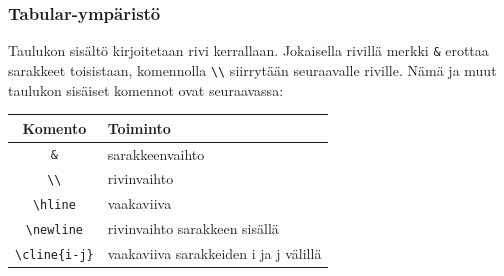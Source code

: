 \begin{frame}[fragile]
    \frametitle{Tabular-ympäristö}
    Taulukon sisältö kirjoitetaan rivi kerrallaan. Jokaisella rivillä merkki \verb-&- erottaa sarakkeet toisistaan, komennolla \verb-\\- siirrytään seuraavalle riville.  Nämä ja muut taulukon sisäiset komennot ovat seuraavassa:
    \vaihto
    \begin{table}[h!]
        \begin{scriptsize}
            \begin{tabular}{cp{4cm}}
                Komento & Toiminto\\
                \hline
                \verb-&- & sarakkeenvaihto\\
                \hline
                \verb-\\- & rivinvaihto\\
                \hline
                \verb-\hline- & vaakaviiva \\
                \hline
                \verb-\newline- & rivinvaihto sarakkeen sisällä\\
                \hline
                \verb+\cline{i-j}+ & vaakaviiva sarakkeiden i ja j välillä\\
                \hline
            \end{tabular}
        \end{scriptsize}
    \end{table}

\end{frame}

